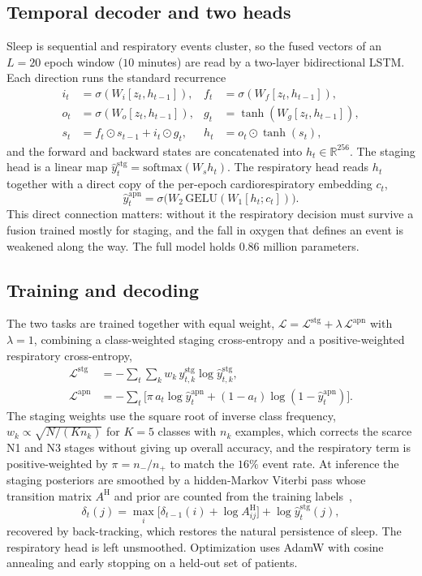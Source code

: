 \documentclass[preprint,12pt]{elsarticle}
\begin{document}
\subsection{Temporal decoder and two heads}
Sleep is sequential and respiratory events cluster, so the fused vectors of an $L=20$ epoch
window ($10$ minutes) are read by a two-layer bidirectional LSTM. Each direction runs the
standard recurrence
\begin{align}
i_t&=\sigma(W_i[z_t,h_{t-1}]), & f_t&=\sigma(W_f[z_t,h_{t-1}]),\nonumber\\
o_t&=\sigma(W_o[z_t,h_{t-1}]), & g_t&=\tanh(W_g[z_t,h_{t-1}]),\\
s_t&=f_t\odot s_{t-1}+i_t\odot g_t, & h_t&=o_t\odot\tanh(s_t),\nonumber
\end{align}
and the forward and backward states are concatenated into $h_t\in\mathbb{R}^{256}$. The
staging head is a linear map $\hat y^{\mathrm{stg}}_t=\mathrm{softmax}(W_s h_t)$. The
respiratory head reads $h_t$ together with a direct copy of the per-epoch cardiorespiratory
embedding $c_t$,
\begin{equation}
\hat y^{\mathrm{apn}}_t=\sigma\!\big(W_2\,\mathrm{GELU}(W_1[h_t;c_t])\big).
\end{equation}
This direct connection matters: without it the respiratory decision must survive a fusion
trained mostly for staging, and the fall in oxygen that defines an event is weakened along the
way. The full model holds $0.86$ million parameters.

\subsection{Training and decoding}
The two tasks are trained together with equal weight, $\mathcal{L}=\mathcal{L}^{\mathrm{stg}}+\lambda\,\mathcal{L}^{\mathrm{apn}}$ with $\lambda=1$, combining a class-weighted staging cross-entropy and a positive-weighted respiratory cross-entropy,
\begin{align}
\mathcal{L}^{\mathrm{stg}}&=-\sum_t\sum_{k}w_k\,y^{\mathrm{stg}}_{t,k}\log\hat y^{\mathrm{stg}}_{t,k},\\
\mathcal{L}^{\mathrm{apn}}&=-\sum_t\big[\pi\,a_t\log\hat y^{\mathrm{apn}}_t+(1-a_t)\log(1-\hat y^{\mathrm{apn}}_t)\big].
\end{align}
The staging weights use the square root of inverse class frequency,
$w_k\propto\sqrt{N/(K n_k)}$ for $K=5$ classes with $n_k$ examples, which corrects the scarce
N1 and N3 stages without giving up overall accuracy, and the respiratory term is
positive-weighted by $\pi=n_-/n_+$ to match the $16\%$ event rate. At inference the staging
posteriors are smoothed by a hidden-Markov Viterbi pass whose transition matrix $A^{\mathrm H}$
and prior are counted from the training labels~\cite{chen2024hmm},
\begin{equation}
\delta_t(j)=\max_i\big[\delta_{t-1}(i)+\log A^{\mathrm H}_{ij}\big]+\log\hat y^{\mathrm{stg}}_t(j),
\end{equation}
recovered by back-tracking, which restores the natural persistence of sleep. The respiratory
head is left unsmoothed. Optimization uses AdamW with cosine annealing and early stopping on a
held-out set of patients.
\end{document}

